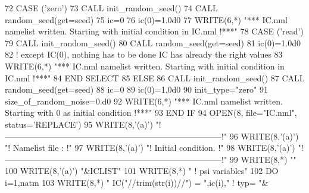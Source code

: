 \begin{DoxyCode}
72          \textcolor{keywordflow}{CASE} (\textcolor{stringliteral}{'zero'})
73            \textcolor{keyword}{CALL }init\_random\_seed()
74            \textcolor{keyword}{CALL }random\_seed(get=seed)
75            ic=0
76            ic(0)=1.0d0
77            \textcolor{keyword}{WRITE}(6,*) \textcolor{stringliteral}{"*** IC.nml namelist written. Starting with initial condition in IC.nml !***"}
78          \textcolor{keywordflow}{CASE} (\textcolor{stringliteral}{'read'})
79            \textcolor{keyword}{CALL }init\_random\_seed()
80            \textcolor{keyword}{CALL }random\_seed(get=seed)
81            ic(0)=1.0d0
82            \textcolor{comment}{! except IC(0), nothing has to be done IC has already the right values}
83            \textcolor{keyword}{WRITE}(6,*) \textcolor{stringliteral}{"*** IC.nml namelist written. Starting with initial condition in IC.nml !***"}
84 \textcolor{keywordflow}{       END SELECT}
85     \textcolor{keywordflow}{ELSE}
86        \textcolor{keyword}{CALL }init\_random\_seed()
87        \textcolor{keyword}{CALL }random\_seed(get=seed)
88        ic=0
89        ic(0)=1.0d0
90        init\_type=\textcolor{stringliteral}{"zero"}
91        size\_of\_random\_noise=0.d0
92        \textcolor{keyword}{WRITE}(6,*) \textcolor{stringliteral}{"*** IC.nml namelist written. Starting with 0 as initial condition !***"}
93 \textcolor{keywordflow}{    END IF}
94     \textcolor{keyword}{OPEN}(8, file=\textcolor{stringliteral}{"IC.nml"}, status=\textcolor{stringliteral}{'REPLACE'})
95     \textcolor{keyword}{WRITE}(8,\textcolor{stringliteral}{'(a)'}) \textcolor{stringliteral}{"!------------------------------------------------------------------------------!"}
96     \textcolor{keyword}{WRITE}(8,\textcolor{stringliteral}{'(a)'}) \textcolor{stringliteral}{"! Namelist file :                                                              !"}
97     \textcolor{keyword}{WRITE}(8,\textcolor{stringliteral}{'(a)'}) \textcolor{stringliteral}{"! Initial condition.                                                           !"}
98     \textcolor{keyword}{WRITE}(8,\textcolor{stringliteral}{'(a)'}) \textcolor{stringliteral}{"!------------------------------------------------------------------------------!"}
99     \textcolor{keyword}{WRITE}(8,*) \textcolor{stringliteral}{""}
100     \textcolor{keyword}{WRITE}(8,\textcolor{stringliteral}{'(a)'}) \textcolor{stringliteral}{"&ICLIST"}
101     \textcolor{keyword}{WRITE}(8,*) \textcolor{stringliteral}{" ! psi variables"}
102     \textcolor{keywordflow}{DO} i=1,natm
103        \textcolor{keyword}{WRITE}(8,*) \textcolor{stringliteral}{" IC("}//trim(str(i))//\textcolor{stringliteral}{") = "},ic(i),\textcolor{stringliteral}{"   ! typ= "}&

\end{DoxyCode}
